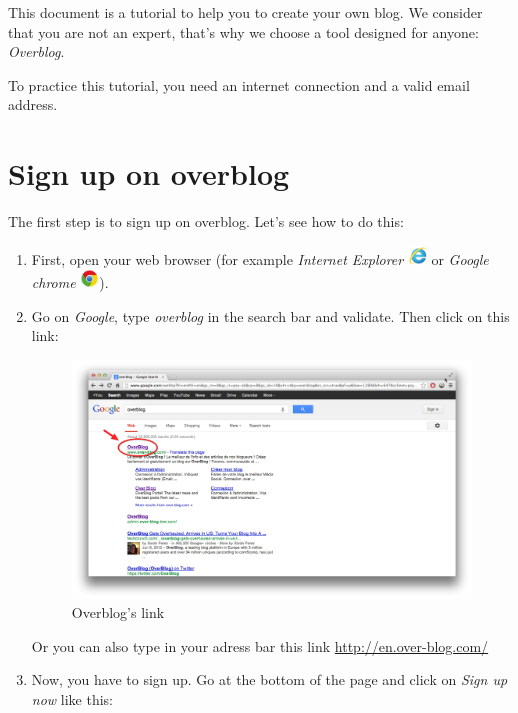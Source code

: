 \documentclass[a4paper,10pt]{article}
\begin{document}
This document is a tutorial to help you to create your own blog. We consider that you are not an expert, that's why we choose a tool designed for anyone: \emph{Overblog}.

To practice this tutorial, you need an internet connection and a valid email address.

\newpage
\section{Sign up on overblog}
The first step is to sign up on overblog. Let's see how to do this:
\begin{enumerate}
\item First, open your web browser (for example \emph{Internet Explorer} \includegraphics[width=0.5cm]{Images/explorer.png} or \emph{Google chrome} \includegraphics[width=0.5cm]{Images/chrome.png}).
\item Go on \emph{Google}, type \emph{overblog} in the search bar and validate. Then click on this link:
\begin{figure}[H]
    \center
	\includegraphics[width=13cm]{Images/linkOverblog.png}
    \caption{Overblog's link}
\end{figure}
Or you can also type in your adress bar this link \url{http://en.over-blog.com/}
\item Now, you have to sign up. Go at the bottom of the page and click on \emph{Sign up now} like this:

\end{enumerate}
\end{document}
